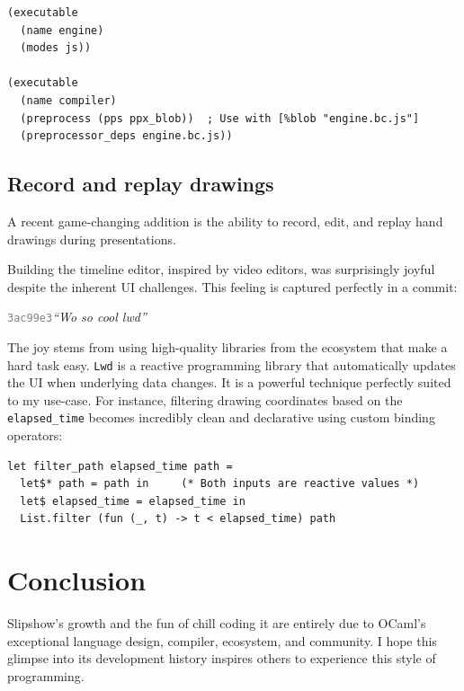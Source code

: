 \documentclass[10pt,a4paper]{article}
\newcommand{\commit}[1]{\texttt{\textcolor{gray}{#1}}}
\newcommand{\gitquote}[2]{\medskip\texttt{\textcolor{gray}{#1}}\quad\emph{``#2''}\medskip}
\begin{document}
\begin{verbatim}
(executable
  (name engine)
  (modes js))

(executable
  (name compiler)
  (preprocess (pps ppx_blob))  ; Use with [%blob "engine.bc.js"]
  (preprocessor_deps engine.bc.js))
\end{verbatim}

\subsection{Record and replay drawings}

A recent game-changing addition is the ability to record, edit, and replay hand
drawings during presentations.

Building the timeline editor, inspired by video editors, was surprisingly joyful
despite the inherent UI challenges. This feeling is captured perfectly in a
commit:

\gitquote{3ac99e3}{Wo so cool lwd}

The joy stems from using high-quality libraries from the ecosystem that make a
hard task easy. \texttt{Lwd} is a reactive programming library that
automatically updates the UI when underlying data changes. It is a powerful
technique perfectly suited to my use-case. For instance, filtering drawing
coordinates based on the \texttt{elapsed\_time} becomes incredibly clean and
declarative using custom binding operators:

\begin{verbatim}
let filter_path elapsed_time path =
  let$* path = path in     (* Both inputs are reactive values *)
  let$ elapsed_time = elapsed_time in
  List.filter (fun (_, t) -> t < elapsed_time) path
\end{verbatim}




\section{Conclusion}

Slipshow's growth and the fun of chill coding it are entirely due to OCaml's exceptional language design, compiler, ecosystem, and community. I hope this glimpse into its development history inspires others to experience this style of programming.
\end{document}
